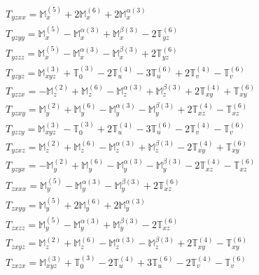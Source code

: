 \documentclass[fleqn,8pt,landscape]{jsarticle}
\begin{document}
\begin{align*}
& T_{yzxx} = \mathbb{M}_{x}^{(5)} + 2 \mathbb{M}_{x}^{(6)} + 2 \mathbb{M}_{x}^{\alpha(3)} \\
& T_{yzyy} = \mathbb{M}_{x}^{(5)} - \mathbb{M}_{x}^{\alpha(3)} + \mathbb{M}_{x}^{\beta(3)} - 2 \mathbb{T}_{yz}^{(6)} \\
& T_{yzzz} = \mathbb{M}_{x}^{(5)} - \mathbb{M}_{x}^{\alpha(3)} - \mathbb{M}_{x}^{\beta(3)} + 2 \mathbb{T}_{yz}^{(6)} \\
& T_{yzyz} = \mathbb{M}_{xyz}^{(3)} + \mathbb{T}_{0}^{(3)} - 2 \mathbb{T}_{u}^{(4)} - 3 \mathbb{T}_{u}^{(6)} + 2 \mathbb{T}_{v}^{(4)} - \mathbb{T}_{v}^{(6)} \\
& T_{yzzx} = - \mathbb{M}_{z}^{(2)} + \mathbb{M}_{z}^{(6)} - \mathbb{M}_{z}^{\alpha(3)} + \mathbb{M}_{z}^{\beta(3)} + 2 \mathbb{T}_{xy}^{(4)} + \mathbb{T}_{xy}^{(6)} \\
& T_{yzxy} = \mathbb{M}_{y}^{(2)} + \mathbb{M}_{y}^{(6)} - \mathbb{M}_{y}^{\alpha(3)} - \mathbb{M}_{y}^{\beta(3)} + 2 \mathbb{T}_{xz}^{(4)} - \mathbb{T}_{xz}^{(6)} \\
& T_{yzzy} = \mathbb{M}_{xyz}^{(3)} - \mathbb{T}_{0}^{(3)} + 2 \mathbb{T}_{u}^{(4)} - 3 \mathbb{T}_{u}^{(6)} - 2 \mathbb{T}_{v}^{(4)} - \mathbb{T}_{v}^{(6)} \\
& T_{yzxz} = \mathbb{M}_{z}^{(2)} + \mathbb{M}_{z}^{(6)} - \mathbb{M}_{z}^{\alpha(3)} + \mathbb{M}_{z}^{\beta(3)} - 2 \mathbb{T}_{xy}^{(4)} + \mathbb{T}_{xy}^{(6)} \\
& T_{yzyx} = - \mathbb{M}_{y}^{(2)} + \mathbb{M}_{y}^{(6)} - \mathbb{M}_{y}^{\alpha(3)} - \mathbb{M}_{y}^{\beta(3)} - 2 \mathbb{T}_{xz}^{(4)} - \mathbb{T}_{xz}^{(6)} \\
& T_{zxxx} = \mathbb{M}_{y}^{(5)} - \mathbb{M}_{y}^{\alpha(3)} - \mathbb{M}_{y}^{\beta(3)} + 2 \mathbb{T}_{xz}^{(6)} \\
& T_{zxyy} = \mathbb{M}_{y}^{(5)} + 2 \mathbb{M}_{y}^{(6)} + 2 \mathbb{M}_{y}^{\alpha(3)} \\
& T_{zxzz} = \mathbb{M}_{y}^{(5)} - \mathbb{M}_{y}^{\alpha(3)} + \mathbb{M}_{y}^{\beta(3)} - 2 \mathbb{T}_{xz}^{(6)} \\
& T_{zxyz} = \mathbb{M}_{z}^{(2)} + \mathbb{M}_{z}^{(6)} - \mathbb{M}_{z}^{\alpha(3)} - \mathbb{M}_{z}^{\beta(3)} + 2 \mathbb{T}_{xy}^{(4)} - \mathbb{T}_{xy}^{(6)} \\
& T_{zxzx} = \mathbb{M}_{xyz}^{(3)} + \mathbb{T}_{0}^{(3)} - 2 \mathbb{T}_{u}^{(4)} + 3 \mathbb{T}_{u}^{(6)} - 2 \mathbb{T}_{v}^{(4)} - \mathbb{T}_{v}^{(6)} \\

\end{align*}
\end{document}
